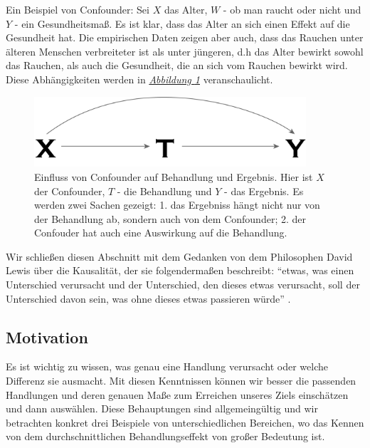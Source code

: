 \documentclass[12pt,a4paper,twoside]{scrartcl}
\numberwithin{equation}{section}
\newcommand{\reffig}[1]{\emph{\hyperref[#1]{Abbildung \ref*{#1}}}}
\begin{document}
\noindent
Ein Beispiel von Confounder: Sei $X$ das Alter, $W$ - ob man raucht oder nicht und $Y$ - ein Gesundheitsmaß. Es ist klar, dass das Alter an sich einen Effekt auf die Gesundheit hat. Die empirischen Daten zeigen aber auch, dass das Rauchen unter älteren Menschen verbreiteter ist als unter jüngeren, d.h das Alter bewirkt sowohl das Rauchen, als auch die Gesundheit, die an sich vom Rauchen bewirkt wird. Diese Abhängigkeiten werden in \reffig{fig:confounder} veranschaulicht.\par   	
\begin{center}
  \vspace{6mm}
  \begin{figure}[h]
    \centering
    \includegraphics[height=0.4\textwidth, width=0.9\textwidth]{figures/confounder.png}
    \caption[Einfluss von Confounder auf Behandlung und Ergebnis]{Einfluss von Confounder auf Behandlung und Ergebnis\cite{RebBar}. Hier ist $X$ der Confounder, $T$ - die Behandlung und $Y$ - das Ergebnis. Es werden zwei Sachen gezeigt: 1. das Ergebniss hängt nicht nur von der Behandlung ab, sondern auch von dem Confounder; 2. der Confouder hat auch eine Auswirkung auf die Behandlung.}\label{fig:confounder}
  \end{figure}
\end{center}

\noindent
Wir schließen diesen Abschnitt mit dem Gedanken von dem Philosophen David Lewis über die Kausalität, der sie folgendermaßen beschreibt: \enquote{etwas, was einen Unterschied verursacht und der Unterschied, den dieses etwas verursacht, soll der Unterschied  davon sein, was ohne dieses etwas passieren würde} \cite{lewis1974causation}.\par

\subsection{Motivation}\label{subsec:motivation}
Es ist wichtig zu wissen, was genau eine Handlung verursacht oder welche Differenz sie ausmacht. Mit diesen Kenntnissen können wir besser die passenden Handlungen und deren genauen Maße zum Erreichen unseres Ziels einschätzen und dann auswählen. Diese Behauptungen sind allgemeingültig und wir betrachten konkret drei Beispiele von unterschiedlichen Bereichen, wo das Kennen von dem durchschnittlichen Behandlungseffekt von großer Bedeutung ist.\par
\end{document}
